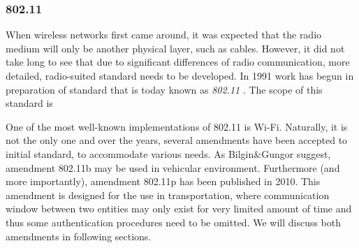\subsubsection{802.11}
% 
When wireless networks first came around, it was expected that the radio medium will only be another physical layer, such as cables. However, it did not take long to see that due to significant differences of radio communication, more detailed, radio-suited standard needs to be developed. In 1991 work has begun in preparation of standard that is today known as \emph{802.11} \cite{Hiertz2010TheUniverse}. The scope of this standard is \par
One of the most well-known implementations of 802.11 is Wi-Fi. Naturally, it is not the only one and over the years, several amendments have been accepted to initial standard, to accommodate various needs. As Bilgin\&Gungor \cite{Bilgin2013PerformanceAreas} suggest, amendment 802.11b may be used in vehicular environment. Furthermore (and more importantly), amendment 802.11p has been published in 2010. This amendment is designed for the use in transportation, where communication window between two entities may only exist for very limited amount of time and thus some authentication procedures need to be omitted. We will discuss both amendments in following sections.
% 
% 
% 

